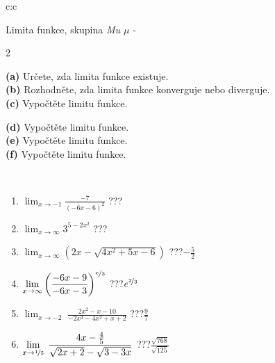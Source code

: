 \documentclass[10pt]{report}
\begin{document}
\begin{tabular}{c:c}
\begin{minipage}[c][104.5mm][t]{0.5\linewidth}
\begin{center}
\vspace{7mm}
{\huge Limita funkce, skupina \textit{Mu $\mu$} -}\\[5mm]
\begin{minipage}{0.95\linewidth}
\begin{center}
{\small \begin{multicols}{2} \raggedright
\textbf{(a)} Určete, zda limita funkce existuje. \\[1mm]
\textbf{(b)} Rozhodněte, zda limita funkce konverguje nebo diverguje. \\[1mm]
\textbf{(c)} Vypočtěte limitu funkce. \par \columnbreak
\textbf{(d)} Vypočtěte limitu funkce. \\[1mm]
\textbf{(e)} Vypočtěte limitu funkce. \\[1mm]
\textbf{(f)} Vypočtěte limitu funkce. \\[1mm]
\end{multicols}
}
\end{center}
\end{minipage}
\\[4mm]
\begin{minipage}{0.79\linewidth}
\begin{center}
\begin{varwidth}{\linewidth}
\begin{enumerate}
\normalsize
\item $\displaystyle\lim_{x\to-1}{\frac{-7}{(-6x-6)^{2}}}$\quad \dotfill\; ???\;\dotfill \quad {}
\item $\displaystyle\lim_{x\to\infty}{3^{5-2x^2}}$\quad \dotfill\; ???\;\dotfill \quad {}
\item $\displaystyle\lim_{x\to\infty}{\left(2x - \sqrt{4x^2+5x-6}\right)}$\quad \dotfill\; ???\;\dotfill \quad $-\frac{5}{2}$
\item $\displaystyle\lim_{x\to\infty}{\left( \frac{-6x-9}{-6x-3} \right)^{\nicefrac{x}{3}}}$\quad \dotfill\; ???\;\dotfill \quad $e^{\nicefrac{2}{3}}$
\item $\displaystyle\lim_{x\to -2}{\;\frac{2x^2-x-10}{-2x^3-4x^2+x+2}}$\quad \dotfill\; ???\;\dotfill \quad $\frac{9}{7}$
\item $\displaystyle\lim_{x\to \nicefrac{1}{5}}{\;\frac{4x-\frac{4}{5}}{\sqrt{2x+2} - \sqrt{3-3x}}}$\quad \dotfill\; ???\;\dotfill \quad $\frac{\sqrt{768}}{\sqrt{125}}$

\end{enumerate}
\end{varwidth}
\end{center}
\end{minipage}
\end{center}
\end{minipage}
\end{tabular}
\end{document}
